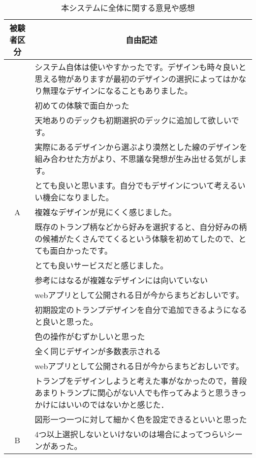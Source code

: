 \begin{table}[htbp]
    \centering
    \caption{本システムに全体に関する意見や感想}
    \begin{tabular}{|c|p{29em}|} \hline
          被験者区分 & \multicolumn{1}{|c|}{自由記述}  \\ \hline
           & システム自体は使いやすかったです。デザインも時々良いと思える物がありますが最初のデザインの選択によってはかなり無理なデザインになることもありました。 \\\cline{2-2}
          　&  初めての体験で面白かった\\\cline{2-2}
            &  天地ありのデックも初期選択のデックに追加して欲しいです。\\\cline{2-2}
            & 実際にあるデザインから選ぶより漠然とした線のデザインを組み合わせた方がより、不思議な発想が生み出せる気がします。\\\cline{2-2}
            &とても良いと思います。自分でもデザインについて考えるいい機会になりました。\\\cline{2-2}
            A& 複雑なデザインが見にくく感じました。\\\cline{2-2}
            &既存のトランプ柄などから好みを選択すると、自分好みの柄の候補がたくさんでてくるという体験を初めてしたので、とても面白かったです。\\\cline{2-2}
            &とても良いサービスだと感じました。\\\cline{2-2}
            &参考にはなるが複雑なデザインには向いていない\\\hline
          &  webアプリとして公開される日が今からまちどおしいです。\\\cline{2-2}
                & 初期設定のトランプデザインを自分で追加できるようになると良いと思った。 \\\cline{2-2}
                & 色の操作がむずかしいと思った \\\cline{2-2}
                &全く同じデザインが多数表示される\\\cline{2-2}
                & webアプリとして公開される日が今からまちどおしいです。 \\\cline{2-2}
                & トランプをデザインしようと考えた事がなかったので，普段あまりトランプに関心がない人でも作ってみようと思うきっかけにはいいのではないかと感じた． \\\cline{2-2}
                & 図形一つ一つに対して細かく色を設定できるといいと思った \\ \cline{2-2}
            B    & 4つ以上選択しないといけないのは場合によってつらいシーンがあった。\\\cline{2-2}

\end{tabular}
\end{table}
